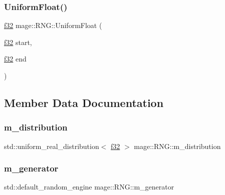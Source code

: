 \hypertarget{classmage_1_1_r_n_g_aff7f8fcaf452916054ff5768a875aeb2}{}\label{classmage_1_1_r_n_g_aff7f8fcaf452916054ff5768a875aeb2} 
\subsubsection{\texorpdfstring{Uniform\+Float()}{UniformFloat()}}
{\footnotesize\ttfamily \hyperlink{namespacemage_a6a44ad388483959dc4dff9f2aef91431}{f32} mage\+::\+R\+N\+G\+::\+Uniform\+Float (\begin{DoxyParamCaption}\item[{\hyperlink{namespacemage_a6a44ad388483959dc4dff9f2aef91431}{f32}}]{start,  }\item[{\hyperlink{namespacemage_a6a44ad388483959dc4dff9f2aef91431}{f32}}]{end }\end{DoxyParamCaption})\hspace{0.3cm}{\ttfamily [noexcept]}}



\subsection{Member Data Documentation}
\hypertarget{classmage_1_1_r_n_g_ac446994fa379a52ee312bee0cf2e0e24}{}\label{classmage_1_1_r_n_g_ac446994fa379a52ee312bee0cf2e0e24} 
\subsubsection{\texorpdfstring{m\+\_\+distribution}{m\_distribution}}
{\footnotesize\ttfamily std\+::uniform\+\_\+real\+\_\+distribution$<$ \hyperlink{namespacemage_a6a44ad388483959dc4dff9f2aef91431}{f32} $>$ mage\+::\+R\+N\+G\+::m\+\_\+distribution\hspace{0.3cm}{\ttfamily [private]}}

\hypertarget{classmage_1_1_r_n_g_a43dc452c2e32d468fa42d16e02d3a283}{}\label{classmage_1_1_r_n_g_a43dc452c2e32d468fa42d16e02d3a283} 
\subsubsection{\texorpdfstring{m\+\_\+generator}{m\_generator}}
{\footnotesize\ttfamily std\+::default\+\_\+random\+\_\+engine mage\+::\+R\+N\+G\+::m\+\_\+generator\hspace{0.3cm}{\ttfamily [private]}}

